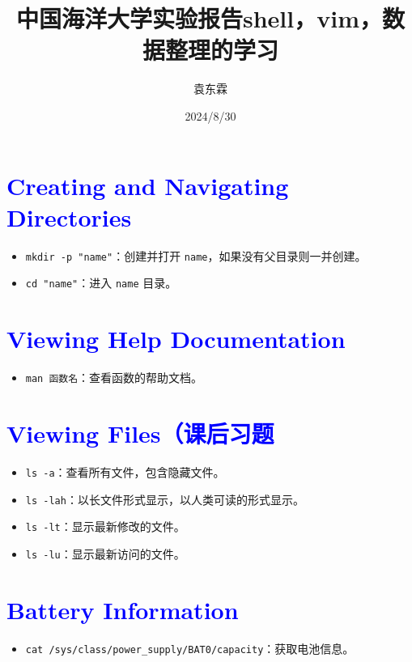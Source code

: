 \documentclass{article}
\begin{document}
\title{中国海洋大学实验报告}
\maketitle
\title{shell，vim，数据整理的学习}
\author{袁东霖}
\date{2024/8/30}
\maketitle
\section{\textcolor{blue}{Creating and Navigating Directories}}
\begin{itemize}
    \item \texttt{mkdir -p "name"}：创建并打开 \texttt{name}，如果没有父目录则一并创建。
    \item \texttt{cd "name"}：进入 \texttt{name} 目录。
\end{itemize}

\section{\textcolor{blue}{Viewing Help Documentation}}
\begin{itemize}
    \item \texttt{man 函数名}：查看函数的帮助文档。
\end{itemize}

\section{\textcolor{blue}{Viewing Files（课后习题}}
\begin{itemize}
    \item \texttt{ls -a}：查看所有文件，包含隐藏文件。
    \item \texttt{ls -lah}：以长文件形式显示，以人类可读的形式显示。
    \item \texttt{ls -lt}：显示最新修改的文件。
    \item \texttt{ls -lu}：显示最新访问的文件。
\end{itemize}

\section{\textcolor{blue}{Battery Information}}
\begin{itemize}
    \item \texttt{cat /sys/class/power\_supply/BAT0/capacity}：获取电池信息。
\end{itemize}
\end{document}
